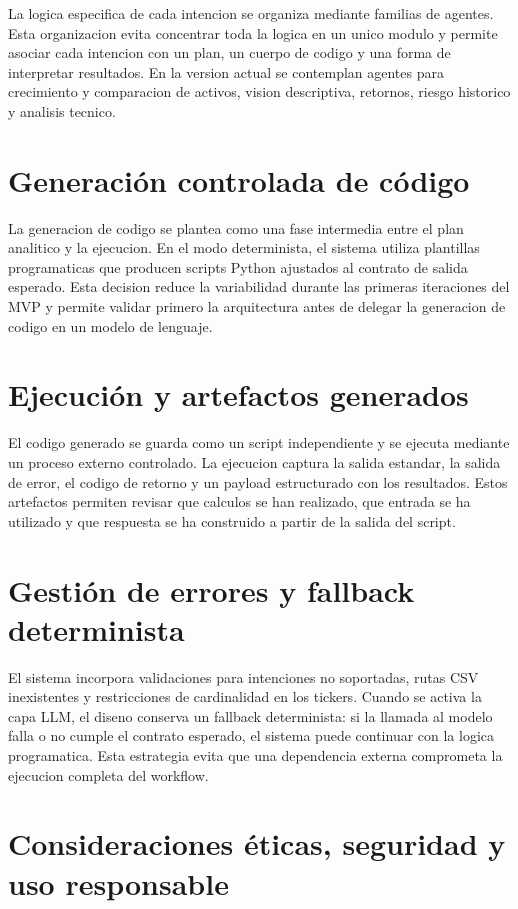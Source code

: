La logica especifica de cada intencion se organiza mediante familias de agentes. Esta organizacion evita concentrar toda la logica en un unico modulo y permite asociar cada intencion con un plan, un cuerpo de codigo y una forma de interpretar resultados. En la version actual se contemplan agentes para crecimiento y comparacion de activos, vision descriptiva, retornos, riesgo historico y analisis tecnico.

\section{Generaci\'on controlada de c\'odigo}

La generacion de codigo se plantea como una fase intermedia entre el plan analitico y la ejecucion. En el modo determinista, el sistema utiliza plantillas programaticas que producen scripts Python ajustados al contrato de salida esperado. Esta decision reduce la variabilidad durante las primeras iteraciones del MVP y permite validar primero la arquitectura antes de delegar la generacion de codigo en un modelo de lenguaje.

\section{Ejecuci\'on y artefactos generados}

El codigo generado se guarda como un script independiente y se ejecuta mediante un proceso externo controlado. La ejecucion captura la salida estandar, la salida de error, el codigo de retorno y un payload estructurado con los resultados. Estos artefactos permiten revisar que calculos se han realizado, que entrada se ha utilizado y que respuesta se ha construido a partir de la salida del script.

\section{Gesti\'on de errores y fallback determinista}

El sistema incorpora validaciones para intenciones no soportadas, rutas CSV inexistentes y restricciones de cardinalidad en los tickers. Cuando se activa la capa LLM, el diseno conserva un fallback determinista: si la llamada al modelo falla o no cumple el contrato esperado, el sistema puede continuar con la logica programatica. Esta estrategia evita que una dependencia externa comprometa la ejecucion completa del workflow.

\section{Consideraciones \'{e}ticas, seguridad y uso responsable}

